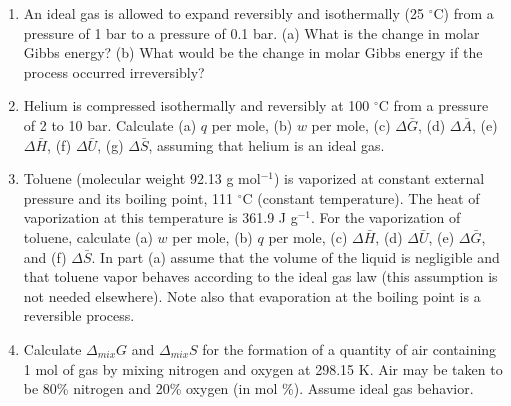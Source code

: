 \begin{enumerate}

\item An ideal gas is allowed to expand reversibly and isothermally (25 $^\circ$C) from a pressure of 1 bar to a pressure of 0.1 bar. (a) What is the change in molar Gibbs energy? (b) What would be the change in molar Gibbs energy if the process occurred irreversibly?


\item Helium is compressed isothermally and reversibly at 100 $^\circ$C from a pressure of 2 to 10 bar. Calculate (a) $q$ per mole, (b) $w$ per mole, (c) $\Delta\bar{G}$, (d) $\Delta\bar{A}$, (e) $\Delta\bar{H}$, (f) $\Delta\bar{U}$, (g) $\Delta\bar{S}$, assuming that helium is an ideal gas.


\item Toluene (molecular weight 92.13 g mol$^{-1}$) is vaporized at constant external pressure and its boiling point, 111 $^\circ$C (constant temperature). The heat of vaporization at this temperature is 361.9 J g$^{-1}$. For the vaporization of toluene, calculate (a) $w$ per mole, (b) $q$ per mole, (c) $\Delta\bar{H}$, (d) $\Delta\bar{U}$, (e) $\Delta\bar{G}$, and (f) $\Delta\bar{S}$. In part (a) assume that the volume of the liquid is negligible and that toluene vapor behaves according to the ideal gas law (this
assumption is not needed elsewhere). Note also that evaporation at the boiling point is a reversible process.


\item Calculate $\Delta_{mix} G$ and $\Delta_{mix} S$ for the formation of a quantity of air containing 1 mol of gas by mixing nitrogen and oxygen at 298.15 K. Air may be taken to be 80\% nitrogen and 20\% oxygen (in mol \%). Assume ideal gas behavior.


\end{enumerate}
